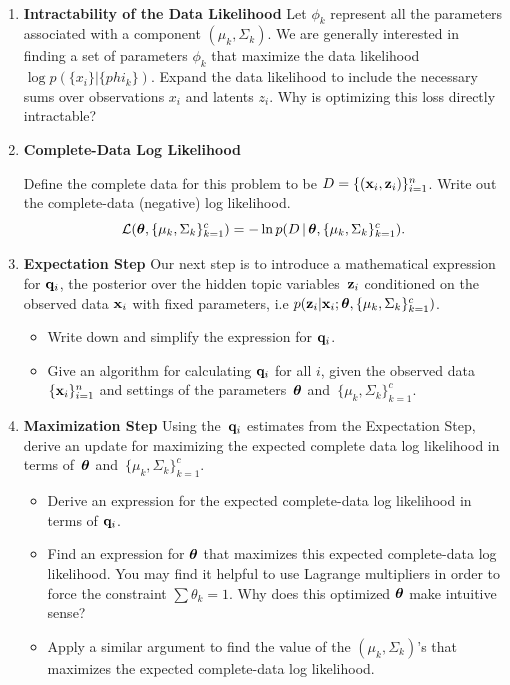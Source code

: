 \documentclass[submit]{harvardml}
\begin{document}
\begin{problem}
      ~

  \begin{enumerate}

  \item \textbf{Intractability of the Data Likelihood} Let $\phi_k$
    represent all the parameters associated with a component
    $(\mu_k,\Sigma_k)$.  We are generally interested in finding a set
    of parameters $\phi_k$ that maximize the data likelihood $\log
    p(\{x_i\}|\{phi_k\})$.  Expand the data likelihood to include the
    necessary sums over observations $x_i$ and latents $z_i$.  Why is
    optimizing this loss directly intractable?
    
\item \textbf{Complete-Data Log Likelihood} 

    Define the complete data for this problem to be $D =
    \{(\mathbf{x}_i, \mathbf{z}_i)\}_{i=1}^n$. Write out the complete-data (negative) log likelihood.
    \[\mathcal{L}(\boldsymbol{\theta}, \{\mu_k,\Sigma_k\}^c_{k=1}) =  -\ln p(D \,|\,\boldsymbol{\theta},
    \{\mu_k,\Sigma_k\}^c_{k=1}).\] 


\item \textbf{Expectation Step}
Our next step is to introduce a mathematical expression for $\mathbf{q}_i$, the posterior over the hidden topic variables~$\mathbf{z}_i$ conditioned on the observed data $\mathbf{x}_i$ with fixed parameters, i.e $p(\mathbf{z}_i | \mathbf{x}_i; \boldsymbol{\theta}, \{ \mu_k,\Sigma_k \}^c_{k=1})$.

\begin{itemize}
\item  Write down and simplify the expression for $\mathbf{q}_i$. 
\item  Give an algorithm for calculating $\mathbf{q}_i$ for all $i$, given the observed data~$\{\mathbf{x}_i\}^n_{i=1}$ and settings of the parameters~$\boldsymbol{\theta}$ and~$\{ \mu_k,\Sigma_k  \}^c_{k=1}$.

\end{itemize}

\item \textbf{Maximization Step}
Using the~$\mathbf{q}_i$ estimates from the Expectation Step, derive an update for maximizing the expected complete data log likelihood in terms of~$\boldsymbol{\theta}$ and~$\{ \mu_k,\Sigma_k \}^c_{k=1}$.

\begin{itemize}
    \item Derive an expression for the expected complete-data log likelihood in terms of $\mathbf{q}_i$.
    \item Find an expression for $\boldsymbol{\theta}$ that maximizes this expected complete-data log likelihood. You may find it helpful to use Lagrange multipliers in order to force the constraint $\sum \theta_k = 1$. Why does this optimized $\boldsymbol{\theta}$ make intuitive sense?
    \item Apply a similar argument to find the value of the $(\mu_k,\Sigma_k)$'s that maximizes the expected complete-data log likelihood. 
\end{itemize}


\end{enumerate}
\end{problem}
\end{document}

